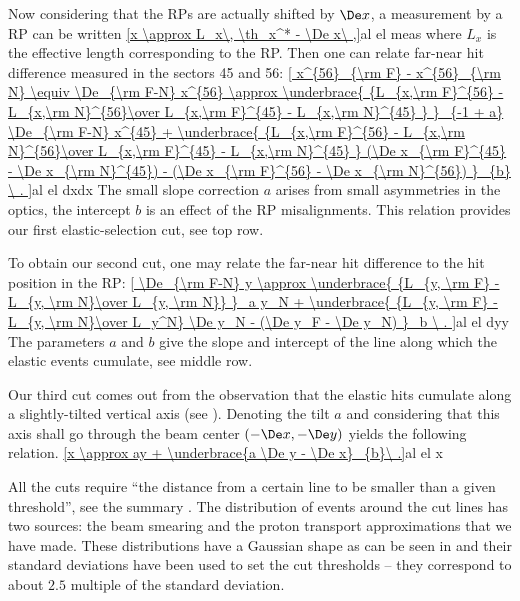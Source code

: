 Now considering that the RPs are actually shifted by $\De x$, a measurement by a RP can be written
\eqref{x \approx L_x\, \th_x^* - \De x\ ,}{al el meas}
where $L_x$ is the effective length corresponding to the RP. Then one can relate far-near hit difference measured in the sectors 45 and 56:
\eqref{
	x^{56}_{\rm F} - x^{56}_{\rm N} \equiv \De_{\rm F-N} x^{56} \approx
	\underbrace{ {L_{x,\rm F}^{56} - L_{x,\rm N}^{56}\over L_{x,\rm F}^{45} - L_{x,\rm N}^{45} } }_{-1 + a} \De_{\rm F-N} x^{45} + 
	\underbrace{ {L_{x,\rm F}^{56} - L_{x,\rm N}^{56}\over L_{x,\rm F}^{45} - L_{x,\rm N}^{45} } (\De x_{\rm F}^{45} - \De x_{\rm N}^{45}) - (\De x_{\rm F}^{56} - \De x_{\rm N}^{56}) }_{b} \ .
}{al el dxdx}
The small slope correction $a$ arises from small asymmetries in the optics, the intercept $b$ is an effect of the RP misalignments. This relation provides our first elastic-selection cut, see  top row.

To obtain our second cut, one may relate the far-near hit difference to the hit position in the RP:
\eqref{
	\De_{\rm F-N} y \approx
	\underbrace{ {L_{y, \rm F} - L_{y, \rm N}\over L_{y, \rm N}} }_a y_N 
	+ \underbrace{ {L_{y, \rm F} - L_{y, \rm N}\over L_y^N} \De y_N - (\De y_F - \De y_N) }_b \ .
}{al el dyy}
The parameters $a$ and $b$ give the slope and intercept of the line along which the elastic events cumulate, see  middle row.

Our third cut comes out from the observation that the elastic hits cumulate along a slightly-tilted vertical axis (see ). Denoting the tilt $a$ and considering that this axis shall go through the beam center $(-\De x, -\De y)$ yields the following relation.
\eqref{x \approx ay + \underbrace{a \De y - \De x}_{b}\ .}{al el x} 

All the cuts  require ``the distance from a certain line to be smaller than a given threshold'', see the summary . The distribution of events around the cut lines has two sources: the beam smearing and the proton transport approximations that we have made. These distributions have a Gaussian shape as can be seen in  and their standard deviations have been used to set the cut thresholds -- they correspond to about $2.5$ multiple of the standard deviation.



